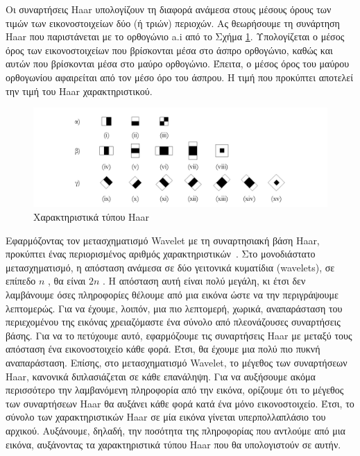 Οι συναρτήσεις Haar υπολογίζουν τη διαφορά ανάμεσα στους μέσους όρους των τιμών των
εικονοστοιχείων δύο (ή τριών) περιοχών. Ας θεωρήσουμε τη συνάρτηση Haar που παριστάνεται με
το ορθογώνιο a.i από το Σχήμα \ref{fig:haarfeatures}. Υπολογίζεται ο μέσος όρος των εικονοστοιχείων που
βρίσκονται μέσα στο άσπρο ορθογώνιο, καθώς και αυτών που βρίσκονται μέσα στο μαύρο
ορθογώνιο. Έπειτα, ο μέσος όρος του μαύρου ορθογωνίου αφαιρείται από τον μέσο όρο του
άσπρου. Η τιμή που προκύπτει αποτελεί την τιμή του Haar χαρακτηριστικού.

\begin{figure}[htbp]
  \begin{center}
    \includegraphics[width=0.8\maxwidth]{../figures/haarfeatures.png}
    \caption{Χαρακτηριστικά τύπου Haar\label{fig:haarfeatures}}
   \end{center}
\end{figure}


Εφαρμόζοντας τον μετασχηματισμό Wavelet με τη συναρτησιακή βάση Haar, προκύπτει
ένας περιορισμένος αριθμός χαρακτηριστικών~\cite{OrePapSinOsu97}. Στο μονοδιάστατο μετασχηματισμό, η
απόσταση ανάμεσα σε δύο γειτονικά κυματίδια (wavelets), σε επίπεδο $n$ , θα είναι $2 n$ . Η απόσταση αυτή είναι
πολύ μεγάλη, κι έτσι δεν λαμβάνουμε όσες πληροφορίες θέλουμε από μια εικόνα ώστε να την
περιγράψουμε λεπτομερώς. Για να έχουμε, λοιπόν, μια πιο λεπτομερή, χωρικά, αναπαράσταση του
περιεχομένου της εικόνας χρειαζόμαστε ένα σύνολο από πλεονάζουσες συναρτήσεις βάσης. Για να
το πετύχουμε αυτό, εφαρμόζουμε τις συναρτήσεις Haar με μεταξύ τους απόσταση ένα
εικονοστοιχείο κάθε φορά. Έτσι, θα έχουμε μια πολύ πιο πυκνή αναπαράσταση. Επίσης, στο
μετασχηματισμό Wavelet, το μέγεθος των συναρτήσεων Haar, κανονικά διπλασιάζεται σε κάθε
επανάληψη. Για να αυξήσουμε ακόμα περισσότερο την λαμβανόμενη πληροφορία από την εικόνα,
ορίζουμε ότι το μέγεθος των συναρτήσεων Haar θα αυξάνει κάθε φορά κατά ένα μόνο
εικονοστοιχείο. Έτσι, το σύνολο των χαρακτηριστικών Haar σε μία εικόνα γίνεται
υπερπολλαπλάσιο του αρχικού. Αυξάνουμε, δηλαδή, την ποσότητα της πληροφορίας που αντλούμε
από μια εικόνα, αυξάνοντας τα χαρακτηριστικά τύπου Haar που θα υπολογιστούν σε αυτήν.

